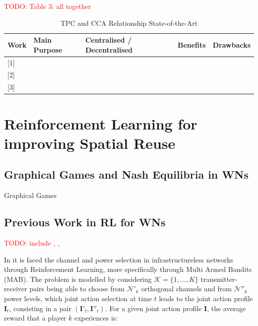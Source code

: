 \documentclass[12pt, a4paper,twoside]{tesi_upf}
\begin{document}
			\textcolor{red}{TODO: Table 3: all together}
			\begin{table}[h!]
				\centering
				\begin{tabular}{|l|l|l|l|l|}
					\hline
					\textbf{Work} & \textbf{Main Purpose} & \textbf{Centralised / Decentralised} & \textbf{Benefits} & \textbf{Drawbacks} \\ \hline
					{[}1{]} &  &  &  &  \\ \hline
					{[}2{]} &  &  &  &  \\ \hline
					{[}3{]} &  &  &  &  \\ \hline
				\end{tabular}
				\caption{TPC and CCA Relationship State-of-the-Art}
				\label{tbl:tpc_cca}
			\end{table}
	
		\section{Reinforcement Learning for improving Spatial Reuse}

	
			\subsection{Graphical Games and Nash Equilibria in WNs}
		
				Graphical Games \cite{li2010competitive}
		
			\subsection{Previous Work in RL for WNs}		
		
				\textcolor{red}{TODO: include \cite{maghsudi2015channel}, \cite{nie1999q}, \cite{bennis2010q}}
					
				In \cite{maghsudi2015joint} it is faced the channel and power selection in infrastructureless networks through Reinforcement Learning, more specifically through Multi Armed Bandits (MAB). The problem is modelled by considering $\mathcal{K}=\{1,...,K\}$ transmitter-receiver pairs being able to choose from $\mathcal{N}'_k$ orthogonal channels and from $\mathcal{N}''_k$ power levels, which joint action selection at time $t$ leads to the joint action profile $\textbf{I}_t$, consisting in a pair $(\textbf{I}'_t,\textbf{I}''_t)$. For a given joint action profile \textbf{I}, the average reward that a player $k$ experiences is:
				
\end{document}
